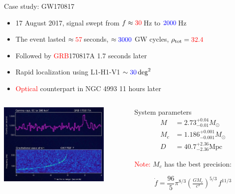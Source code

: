 \documentclass[xcolor=dvipsnames,t]{beamer}
\newcommand{\red}[1]{\textcolor{red}{#1}}
\newcommand{\bl}[1]{\textcolor{blue}{#1}}
\newcommand{\f}{\frac}
\begin{document}
\begin{frame}{Case study: GW170817}
  \begin{itemize}
    \item 17 August 2017, signal swept from $f\approx \red{30}\,$Hz to $\bl{2000}\,$Hz 
    \item The event lasted $\approx \red{57}\,$seconds, $\approx \bl{3000}$ GW cycles, $\rho_\text{tot} = \red{32.4}$
    \item Followed by \red{GRB}170817A 1.7 seconds later
    \item Rapid localization using L1-H1-V1 $\sim \bl{30}\,\text{deg}^2$
    \item \red{Optical} counterpart in NGC 4993 11 hours later
  \end{itemize}  

  \begin{columns}
  \begin{column}{0.5\textwidth}  %
      \begin{center}
      \includegraphics[height=4cm]{figs/GW_GRB170817.jpg}
      \end{center}
  \end{column}
  \begin{column}{0.5\textwidth}
  {
    System parameters
    \begin{align*}
     M&=2.73^{+0.04}_{-0.01} M_\odot \\
     M_c &=1.186^{+0.001}_{-0.001}M_\odot  \\ 
     D&=40.7^{+2.36}_{-2.36}\text{Mpc}
    \end{align*}
  }
  {
    \red{Note:} $M_c$ has the best precision: 
   \begin{small}$${\dot{f}} = \f{96}{5}\pi^{8/3} \left(\tfrac{G M_c}{c^3}\right)^{5/3}\, {f^{11/3}}$$ \end{small}
  } 
    
    \end{column}
  \end{columns} 
  
  

\end{frame}
\end{document}
